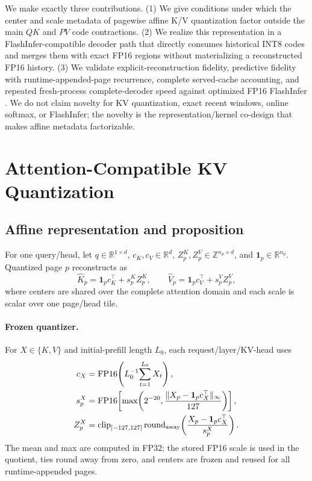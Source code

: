 \documentclass{article}
\begin{document}
We make exactly three contributions.  (1) We give conditions under which the
center and scale metadata of pagewise affine K/V quantization factor outside
the main $QK$ and $PV$ code contractions.  (2) We realize this representation
in a FlashInfer-compatible decoder path that directly consumes historical
INT8 codes and merges them with exact FP16 regions without materializing a
reconstructed FP16 history.  (3) We validate explicit-reconstruction fidelity,
  predictive fidelity with runtime-appended-page recurrence, complete served-cache
  accounting, and repeated fresh-process complete-decoder speed against optimized FP16
FlashInfer \citep{ye2025flashinfer}.  We do not claim novelty for KV
quantization, exact recent windows, online softmax, or FlashInfer; the novelty
is the representation/kernel co-design that makes affine metadata factorizable.

\section{Attention-Compatible KV Quantization}

\subsection{Affine representation and proposition}

For one query/head, let $q\in\mathbb R^{1\times d}$,
$c_K,c_V\in\mathbb R^d$, $Z_p^K,Z_p^V\in\mathbb Z^{n_p\times d}$, and
$\mathbf1_p\in\mathbb R^{n_p}$.  Quantized page $p$ reconstructs as
\begin{equation}
 \widehat K_p=\mathbf1_pc_K^\top+s_p^KZ_p^K,\qquad
 \widehat V_p=\mathbf1_pc_V^\top+s_p^VZ_p^V,                 \label{eq:affine}
\end{equation}
where centers are shared over the complete attention domain and each scale is
scalar over one page/head tile.

\paragraph{Frozen quantizer.}
For $X\in\{K,V\}$ and initial-prefill length $L_0$, each request/layer/KV-head
uses
\begin{align}
c_X&=\operatorname{FP16}\!\left(L_0^{-1}\!\sum_{t=1}^{L_0}X_t\right),\nonumber\\
s_p^X&=\operatorname{FP16}\!\left[\max\!\left(2^{-20},
 \frac{\|X_p-\mathbf1_pc_X^\top\|_\infty}{127}\right)\right],\nonumber\\
Z_p^X&=\operatorname{clip}_{[-127,127]}\operatorname{round}_{\rm away}
 \!\left(\frac{X_p-\mathbf1_pc_X^\top}{s_p^X}\right).       \label{eq:quantizer}
\end{align}
The mean and max are computed in FP32; the stored FP16 scale is used in the
quotient, ties round away from zero, and centers are frozen and reused for all
runtime-appended pages.
\end{document}
